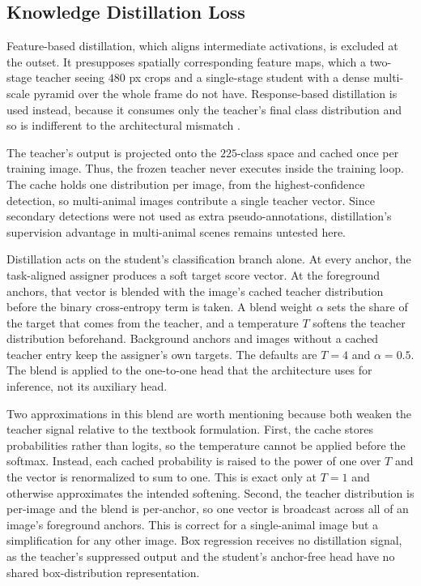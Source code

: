 \subsection{Knowledge Distillation Loss}\label{sec:kd_loss}

Feature-based distillation, which aligns intermediate activations, is excluded at the outset. It presupposes spatially corresponding feature maps, which a two-stage teacher seeing $480$ px crops and a single-stage student with a dense multi-scale pyramid over the whole frame do not have. Response-based distillation \cite{hintonDistillingKnowledgeNeural2015} is used instead, because it consumes only the teacher's final class distribution and so is indifferent to the architectural mismatch \cite{gouKnowledgeDistillationSurvey2021}.

The teacher's output is projected onto the $225$-class space and cached once per training image. Thus, the frozen teacher never executes inside the training loop. The cache holds one distribution per image, from the highest-confidence detection, so multi-animal images contribute a single teacher vector. Since secondary detections were not used as extra pseudo-annotations, distillation's supervision advantage in multi-animal scenes remains untested here.

Distillation acts on the student's classification branch alone. At every anchor, the task-aligned assigner produces a soft target score vector. At the foreground anchors, that vector is blended with the image's cached teacher distribution before the binary cross-entropy term is taken. A blend weight $\alpha$ sets the share of the target that comes from the teacher, and a temperature $T$ softens the teacher distribution beforehand. Background anchors and images without a cached teacher entry keep the assigner's own targets. The defaults are $T = 4$ and $\alpha = 0.5$. The blend is applied to the one-to-one head that the architecture uses for inference, not its auxiliary head.

Two approximations in this blend are worth mentioning because both weaken the teacher signal relative to the textbook formulation. First, the cache stores probabilities rather than logits, so the temperature cannot be applied before the softmax. Instead, each cached probability is raised to the power of one over $T$ and the vector is renormalized to sum to one. This is exact only at $T = 1$ and otherwise approximates the intended softening. Second, the teacher distribution is per-image and the blend is per-anchor, so one vector is broadcast across all of an image's foreground anchors. This is correct for a single-animal image but a simplification for any other image. Box regression receives no distillation signal, as the teacher's suppressed output and the student's anchor-free head have no shared box-distribution representation.

